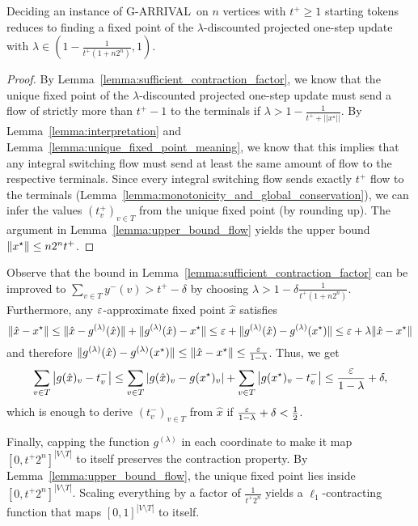 \documentclass[a4paper,UKenglish,cleveref, autoref, thm-restate]{lipics-v2021}
\DeclarePairedDelimiter\norm{\lVert}{\rVert}
\renewcommand{\epsilon}{\ensuremath\varepsilon}
\newcommand{\problem}[1]{\textrm{#1}}
\newcommand{\garrival}{\problem{G-ARRIVAL}}
\begin{document}
\begin{theorem}
    Deciding an instance of \garrival\ on $n$ vertices with $t^+ \geq 1$ starting tokens reduces to finding a fixed point of the $\lambda$-discounted projected one-step update with $\lambda \in (1 - \frac{1}{t^+ (1 + n 2^{n})}, 1)$.
\end{theorem}
\begin{proof}
    By Lemma~\ref{lemma:sufficient_contraction_factor}, we know that the unique fixed point of the $\lambda$-discounted projected one-step update must send a flow of strictly more than $t^+ - 1$ to the terminals if $\lambda > 1 - \frac{1}{t^+ + ||x^\star||}$. By Lemma~\ref{lemma:interpretation} and Lemma~\ref{lemma:unique_fixed_point_meaning}, we know that this implies that any integral switching flow must send at least the same amount of flow to the respective terminals. Since every integral switching flow sends exactly $t^+$ flow to the terminals (Lemma~\ref{lemma:monotonicity_and_global_conservation}), we can infer the values $(t^+_v)_{v \in T}$ from the unique fixed point (by rounding up). The argument in Lemma~\ref{lemma:upper_bound_flow} yields the upper bound $\norm{x^\star} \leq n 2^n t^+$.
\end{proof}

Observe that the bound in Lemma~\ref{lemma:sufficient_contraction_factor} can be improved to $\sum_{v \in T} y^-(v) > t^+ - \delta$ by choosing $\lambda > 1 - \delta \frac{1}{t^+ (1 + n2^n)}$. Furthermore, any $\epsilon$-approximate fixed point 
$\hat{x}$ satisfies 
\[
    \norm{\hat{x} - x^\star} 
    \leq \norm{\hat{x} - g^{(\lambda)}(\hat{x})} + \norm{g^{(\lambda)}(\hat{x}) - x^\star} 
    \leq \epsilon + \norm{g^{(\lambda)}(\hat{x}) - g^{(\lambda)}(x^\star)} 
    \leq \epsilon + \lambda \norm{\hat{x} - x^\star}
\]
and therefore $\norm{g^{(\lambda)}(\hat{x}) - g^{(\lambda)}(x^\star)}  \leq \norm{\hat{x} - x^\star} \leq \frac{\epsilon}{1 - \lambda}$. Thus, we get 
\[
    \sum_{v \in T} \left| g(\hat{x})_v - t^-_v \right| \leq \sum_{v \in T} \left| g(\hat{x})_v - g(x^\star)_v \right| + \sum_{v \in T} \left| g(x^\star)_v - t^-_v \right| \leq \frac{\epsilon}{1 - \lambda} + \delta,
\]
which is enough to derive $(t^-_v)_{v \in T}$ from $\hat{x}$ if $\frac{\epsilon}{1 - \lambda} + \delta < \frac{1}{2}$.

Finally, capping the function $g^{(\lambda)}$ in each coordinate to make it map $[0, t^+ 2^{n}]^{|V\setminus T|}$ to itself preserves the contraction property. By Lemma~\ref{lemma:upper_bound_flow}, the unique fixed point lies inside $[0, t^+ 2^{n}]^{|V\setminus T|}$. Scaling everything by a factor of $\frac{1}{t^+ 2^{n}}$ yields a $\ell_1$-contracting function that maps $[0, 1]^{|V \setminus T|}$ to itself.


\end{document}
